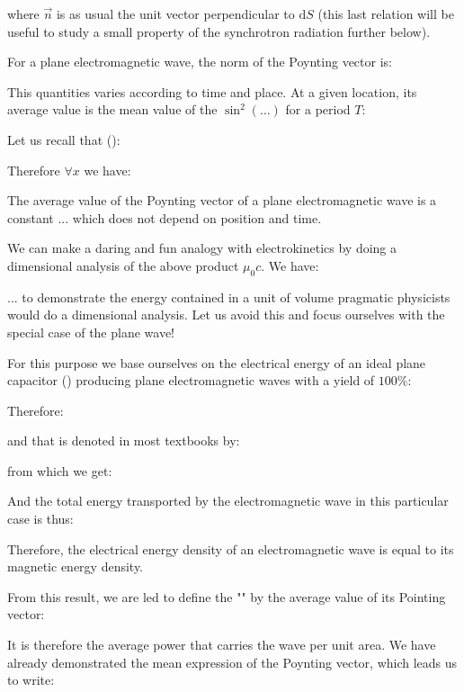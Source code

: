 	where $\vec{n}$ is as usual the unit vector perpendicular to $\mathrm{d}S$ (this last relation will be useful to study a small property of the synchrotron radiation further below).

	For a plane electromagnetic wave, the norm of the Poynting vector is:
	
	This quantities varies according to time and place. At a given location, its average value is the mean value of the $\sin^2(\ldots)$ for a period $T$:
	
	Let us recall that ():
	
	Therefore $\forall x$ we have:
	
	The average value of the Poynting vector of a plane electromagnetic wave is a constant ... which does not depend on position and time.
	
	\begin{tcolorbox}[title=Remark,colframe=black,arc=10pt]
	We can make a daring and fun analogy with electrokinetics by doing a dimensional analysis of the above product $\mu_0c$. We have:
	
	\end{tcolorbox}
	... to demonstrate the energy contained in a unit of volume pragmatic physicists would do a dimensional analysis. Let us avoid this and focus ourselves with the special case of the plane wave!

	For this purpose we base ourselves on the electrical energy of an ideal plane capacitor () producing plane electromagnetic waves with a yield of $100\%$:
	
	Therefore:
	
	and that is denoted in most textbooks by:
	
	from which we get:
	
	And the total energy transported by the electromagnetic wave in this particular case is thus:
	
	Therefore, the electrical energy density of an electromagnetic wave is equal to its magnetic energy density.

	From this result, we are led to define the "" by the average value of its Pointing vector:
	
	It is therefore the average power that carries the wave per unit area. We have already demonstrated the mean expression of the Poynting vector, which leads us to write:
	
